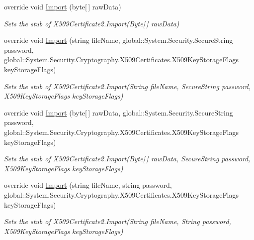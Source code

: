 \begin{DoxyCompactItemize}
override void \hyperlink{class_system_1_1_security_1_1_cryptography_1_1_x509_certificates_1_1_fakes_1_1_stub_x509_certificate2_a33fa15b440895ffadf5d657b0320aaa2}{Import} (byte\mbox{[}$\,$\mbox{]} raw\-Data)
\begin{DoxyCompactList}\small\item\em Sets the stub of X509\-Certificate2.\-Import(\-Byte\mbox{[}$\,$\mbox{]} raw\-Data)\end{DoxyCompactList}\item 
override void \hyperlink{class_system_1_1_security_1_1_cryptography_1_1_x509_certificates_1_1_fakes_1_1_stub_x509_certificate2_aaac8b053d9cda418c340a66dd6e397ea}{Import} (string file\-Name, global\-::\-System.\-Security.\-Secure\-String password, global\-::\-System.\-Security.\-Cryptography.\-X509\-Certificates.\-X509\-Key\-Storage\-Flags key\-Storage\-Flags)
\begin{DoxyCompactList}\small\item\em Sets the stub of X509\-Certificate2.\-Import(\-String file\-Name, Secure\-String password, X509\-Key\-Storage\-Flags key\-Storage\-Flags)\end{DoxyCompactList}\item 
override void \hyperlink{class_system_1_1_security_1_1_cryptography_1_1_x509_certificates_1_1_fakes_1_1_stub_x509_certificate2_a47779a6b0f26725016cb8624f37b1e92}{Import} (byte\mbox{[}$\,$\mbox{]} raw\-Data, global\-::\-System.\-Security.\-Secure\-String password, global\-::\-System.\-Security.\-Cryptography.\-X509\-Certificates.\-X509\-Key\-Storage\-Flags key\-Storage\-Flags)
\begin{DoxyCompactList}\small\item\em Sets the stub of X509\-Certificate2.\-Import(\-Byte\mbox{[}$\,$\mbox{]} raw\-Data, Secure\-String password, X509\-Key\-Storage\-Flags key\-Storage\-Flags)\end{DoxyCompactList}\item 
override void \hyperlink{class_system_1_1_security_1_1_cryptography_1_1_x509_certificates_1_1_fakes_1_1_stub_x509_certificate2_ac3f22d61606ca9994ffc9f5ced95ddb7}{Import} (string file\-Name, string password, global\-::\-System.\-Security.\-Cryptography.\-X509\-Certificates.\-X509\-Key\-Storage\-Flags key\-Storage\-Flags)
\begin{DoxyCompactList}\small\item\em Sets the stub of X509\-Certificate2.\-Import(\-String file\-Name, String password, X509\-Key\-Storage\-Flags key\-Storage\-Flags)\end{DoxyCompactList}\item 

\end{DoxyCompactItemize}
